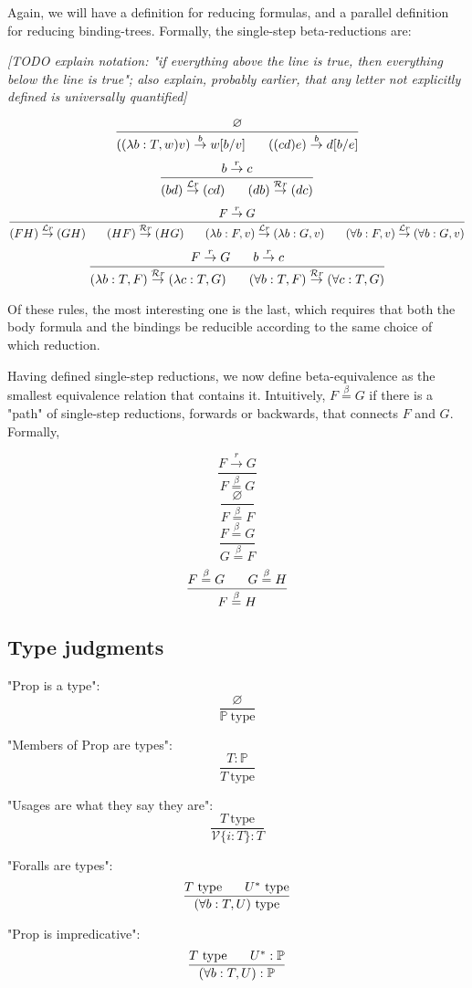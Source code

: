 \documentclass{article}
\newcommand{\Prop}{\mathbb{P}}
\newcommand{\istype}{\ \mathrm{type}}
\newcommand{\usage}{\mathcal{V}}
\newcommand{\usageKnown}[2]{\usage\{#2:#1\}}
\newcommand{\presep}{\hspace{1.8em}}
\newcommand{\subst}[3]{#1[{#2}{/}{#3}]}
\newcommand{\subty}[1]{#1^*}
\newcommand{\betaeq}{\overset{\beta}{=}}
\newcommand{\betared}[1]{\overset{#1}{\rightarrow}}
\begin{document}
  Again, we will have a definition for reducing formulas, and a parallel definition for reducing binding-trees. Formally, the single-step beta-reductions are:
  
  \emph{[TODO explain notation: "if everything above the line is true, then everything below the line is true"; also explain, probably earlier, that any letter not explicitly defined is universally quantified]}
  
\[ \frac{\varnothing}{((\lambda b:T,w)v) \betared{b} \subst{w}{b}{v} \presep ((c d) e) \betared{b} \subst{d}{b}{e}} \]
\[ \frac{b \betared{r} c}{(b d) \betared{\mathcal{L}r} (c d) \presep (d b)\betared{\mathcal{R}r} (d c)} \]
\[ \frac{F \betared{r} G}{(F H) \betared{\mathcal{L}r} (G H) \presep (H F) \betared{\mathcal{R}r} (H G) \presep (\lambda b:F,v) \betared{\mathcal{L}r} (\lambda b:G,v) \presep (\forall b:F,v) \betared{\mathcal{L}r} (\forall b:G,v)} \]
\[ \frac{F \betared{r} G \presep b \betared{r} c}{(\lambda b:T,F) \betared{\mathcal{R}r} (\lambda c:T,G) \presep (\forall b:T,F) \betared{\mathcal{R}r} (\forall c:T,G)} \]

Of these rules, the most interesting one is the last, which requires that both the body formula and the bindings be reducible according to the same choice of which reduction.

Having defined single-step reductions, we now define beta-equivalence as the smallest equivalence relation that contains it. Intuitively, $F \betaeq G$ if there is a "path" of single-step reductions, forwards or backwards, that connects $F$ and $G$. Formally,

\[ \frac{F \betared{r} G}{F \betaeq G} \]
\[ \frac{\varnothing}{F \betaeq F} \]
\[ \frac{F \betaeq G}{G \betaeq F} \]
\[ \frac{F \betaeq G \presep G \betaeq H}{F \betaeq H} \]
  
  
  \subsection{Type judgments}
  
  "Prop is a type":
  \[ \frac{\varnothing}{\Prop\istype} \]  
  
  "Members of Prop are types":
  \[ \frac{T : \Prop}{T\istype} \]
  
  "Usages are what they say they are":
  \[ \frac{T\istype}{\usageKnown{T}{i}:T} \]
  
  "Foralls are types":
  \[ \frac{T\istype\presep \subty{U}\istype}{(\forall b:T,U)\istype} \]
  
  "Prop is impredicative":
  \[ \frac{T\istype\presep \subty{U} : \Prop}{(\forall b:T,U) : \Prop} \]
  
\end{document}
